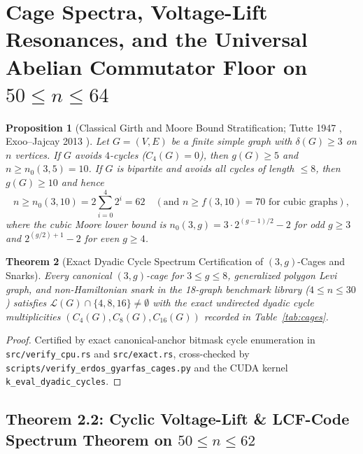 \documentclass[10pt,a4paper]{article}
\newtheorem{theorem}{Theorem}[section]
\newtheorem{proposition}[theorem]{Proposition}
\theoremstyle{definition}
\theoremstyle{remark}
\begin{document}
\section{Cage Spectra, Voltage-Lift Resonances, and the Universal Abelian Commutator Floor on $50 \le n \le 64$}

\begin{proposition}[Classical Girth and Moore Bound Stratification; Tutte 1947 \cite{tutte1947family}, Exoo--Jajcay 2013 \cite{exoo2013dynamic}]\label{prop:moore}
Let $G = (V, E)$ be a finite simple graph with $\delta(G) \ge 3$ on $n$ vertices. If $G$ avoids $4$-cycles ($C_4(G) = 0$), then $g(G) \ge 5$ and $n \ge n_0(3, 5) = 10$. If $G$ is bipartite and avoids all cycles of length $\le 8$, then $g(G) \ge 10$ and hence
\begin{equation}
  n \ge n_0(3, 10) = 2 \sum_{i=0}^{4} 2^i = 62 \quad (\text{and } n \ge f(3, 10) = 70 \text{ for cubic graphs}),
\end{equation}
where the cubic Moore lower bound is $n_0(3, g) = 3 \cdot 2^{(g-1)/2} - 2$ for odd $g \ge 3$ and $2^{(g/2)+1} - 2$ for even $g \ge 4$.
\end{proposition}

\begin{theorem}[Exact Dyadic Cycle Spectrum Certification of $(3,g)$-Cages and Snarks]\label{thm:cages}
Every canonical $(3,g)$-cage for $3 \le g \le 8$, generalized polygon Levi graph, and non-Hamiltonian snark in the 18-graph benchmark library ($4 \le n \le 30$) satisfies $\mathcal{L}(G) \cap \{4, 8, 16\} \ne \emptyset$ with the exact undirected dyadic cycle multiplicities $(C_4(G), C_8(G), C_{16}(G))$ recorded in Table~\ref{tab:cages}.
\end{theorem}

\begin{proof}
Certified by exact canonical-anchor bitmask cycle enumeration in \texttt{src/verify\_cpu.rs} and \texttt{src/exact.rs}, cross-checked by \texttt{scripts/verify\_erdos\_gyarfas\_cages.py} and the CUDA kernel \texttt{k\_eval\_dyadic\_cycles}.
\end{proof}

\subsection{Theorem 2.2: Cyclic Voltage-Lift \& LCF-Code Spectrum Theorem on $50 \le n \le 62$}
\end{document}
